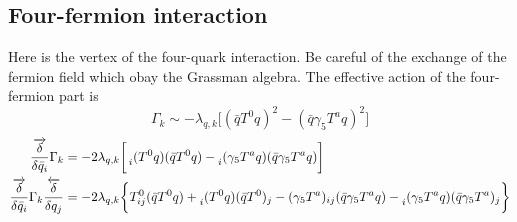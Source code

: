 \documentclass[UTF8]{article}
\begin{document}
\subsection{Four-fermion interaction}
Here is the vertex of the four-quark interaction. Be careful of the exchange of the fermion field which obay the Grassman algebra. The effective action of the four-fermion part is
\begin{equation}
\Gamma_k \sim -\lambda_{q,k}\bigg[ (\bar{q}T^0q)^2-(\bar{q}\gamma_5T^aq)^2 \bigg]
\end{equation}
\begin{equation}
\begin{split}
\frac{\overrightarrow{\delta}}{\delta\bar{q}_i}\Gamma_k&=-2\lambda_{q,k}\bigg[\prescript{}{i}(T^0q)(\bar{q}T^0q)-\prescript{}{i}(\gamma_5T^aq)(\bar{q}\gamma_5T^aq)\bigg]\\
\frac{\overrightarrow{\delta}}{\delta\bar{q}_i}\Gamma_k\frac{\overleftarrow{\delta}}{\delta q_j}&=-2\lambda_{q,k}\bigg\{T^0_{ij}(\bar{q}T^0q)+\prescript{}{i}(T^0q)(\bar{q}T^0)_j-(\gamma_5T^a)_{ij}(\bar{q}\gamma_5T^aq)-\prescript{}{i}(\gamma_5T^aq)(\bar{q}\gamma_5T^a)_j\bigg\}
\end{split}
\end{equation}
\end{document}
